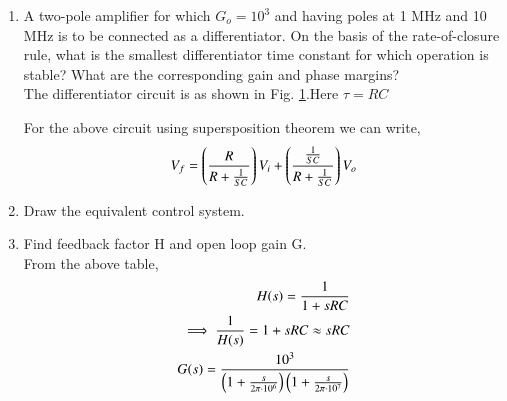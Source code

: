 \begin{enumerate}[label=\thesection.\arabic*.,ref=\thesection.\theenumi]

\item A two-pole amplifier for which $G_{o}=10^{3}$ and having
poles at 1 MHz and 10 MHz is to be connected as a differentiator. On the basis of the rate-of-closure rule, what is the smallest differentiator time constant for which operation is stable? What are the corresponding gain and phase
margins? \\
\solution The differentiator circuit is as shown in Fig. \ref{fig:ee18btech11017_differentiator}.Here $\tau=RC$
\renewcommand{\thefigure}{\theenumi.\arabic{figure}}
%
\begin{figure}[!ht]
	\begin{center}
		
		\resizebox{\columnwidth}{!}{}
	\end{center}
\caption{}
\label{fig:ee18btech11017_differentiator}
\end{figure}
%

\renewcommand{\thefigure}{\theenumi}

For the above circuit using supersposition theorem we can write,
\begin{align}
V_{f}=\brak{\frac{R}{R+\frac{1}{SC}}}V_{i}+\brak{\frac{\frac{1}{SC}}{R+\frac{1}{SC}}}V_{o}
\label{eq:ee18btech11017_fb1}
\end{align}

\item Draw the equivalent control system. \\
\solution 
\begin{figure}[!ht]
	\begin{center}
		
		\resizebox{\columnwidth}{!}{}
	\end{center}
\caption{}
\label{fig:ee18btech11017_blockdiagram}
\end{figure}
%

\renewcommand{\thefigure}{\theenumi}
\begin{table}[!ht]
\centering

\caption{}
\label{table:ee18btech11017_table1}
\end{table}


\item Find feedback factor H and open loop gain G. \\
\solution
From the above table,
\begin{align}
H(s) =\frac{1}{1+sRC} \\
\implies \frac{1}{H(s)}=1+sRC \approx sRC \\
G(s) =\frac{10^3}{\left(1+\frac{s}{2\pi \cdot 10^6}\right)\left(1+\frac{s}{2\pi \cdot 10^7}\right)}
\end{align}


\end{enumerate}
